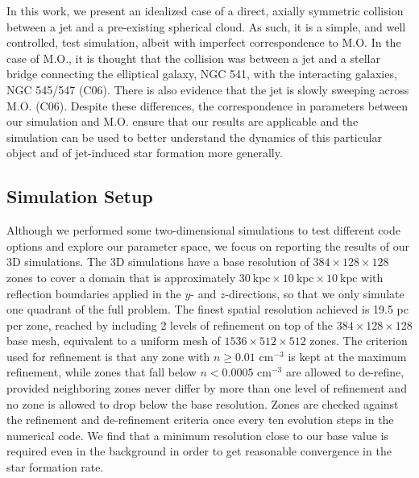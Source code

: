 \documentclass{aastex6}
\begin{document}
In this work, we present an idealized case of a direct, axially symmetric collision between a jet and a pre-existing spherical cloud.  As such, it is a simple, and well controlled, test simulation, albeit with imperfect correspondence to M.O. In the case of M.O., it is thought that the collision was between a jet and a stellar bridge connecting the elliptical galaxy, NGC 541, with the interacting galaxies, NGC 545/547 (C06).  There is also evidence that the jet is slowly sweeping across M.O. (C06).  Despite these differences, the correspondence in parameters between our simulation and M.O. ensure that our results are applicable and the simulation can be used to better understand the dynamics of this particular object and of jet-induced star formation more generally.


\subsection{Simulation Setup}

Although we performed some two-dimensional simulations to test different code options and explore our parameter space, we focus on reporting the results of our 3D simulations.  The 3D simulations have a base resolution of $384\times128\times128$ zones to cover a domain that is approximately $30~\mathrm{kpc} \times 10~\mathrm{kpc} \times 10~\mathrm{kpc}$ with reflection boundaries applied in the $y$- and $z$-directions, so that we only simulate one quadrant of the full problem. The finest spatial resolution achieved is 19.5 pc per zone, reached by including 2 levels of refinement on top of the $384\times128\times128$ base mesh, equivalent to a uniform mesh of $1536\times512\times512$ zones.  The criterion used for refinement is that any zone with $n \ge 0.01$ cm$^{-3}$ is kept at the maximum refinement, while zones that fall below $n < 0.0005$  cm$^{-3}$ are allowed to de-refine, provided neighboring zones never differ by more than one level of refinement and no zone is allowed to drop below the base resolution. Zones are checked against the refinement and de-refinement criteria once every ten evolution steps in the numerical code.  We find that a minimum resolution close to our base value is required even in the background in order to get reasonable convergence in the star formation rate.
\end{document}
